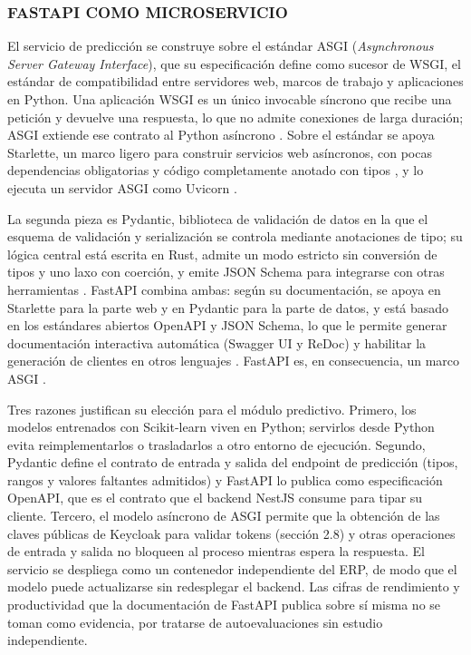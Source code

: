 \subsubsection{FASTAPI COMO MICROSERVICIO}

El servicio de predicción se construye sobre el estándar ASGI (\textit{Asynchronous Server Gateway Interface}), que su especificación define como sucesor de WSGI, el estándar de compatibilidad entre servidores web, marcos de trabajo y aplicaciones en Python. Una aplicación WSGI es un único invocable síncrono que recibe una petición y devuelve una respuesta, lo que no admite conexiones de larga duración; ASGI extiende ese contrato al Python asíncrono \parencite{ASGISpec}. Sobre el estándar se apoya Starlette, un marco ligero para construir servicios web asíncronos, con pocas dependencias obligatorias y código completamente anotado con tipos \parencite{StarletteDocs}, y lo ejecuta un servidor ASGI como Uvicorn \parencite{FastAPIASGI}.

La segunda pieza es Pydantic, biblioteca de validación de datos en la que el esquema de validación y serialización se controla mediante anotaciones de tipo; su lógica central está escrita en Rust, admite un modo estricto sin conversión de tipos y uno laxo con coerción, y emite JSON Schema para integrarse con otras herramientas \parencite{PydanticDocs}. FastAPI combina ambas: según su documentación, se apoya en Starlette para la parte web y en Pydantic para la parte de datos, y está basado en los estándares abiertos OpenAPI y JSON Schema, lo que le permite generar documentación interactiva automática (Swagger UI y ReDoc) y habilitar la generación de clientes en otros lenguajes \parencite{FastAPIDocs}. FastAPI es, en consecuencia, un marco ASGI \parencite{FastAPIASGI}.

Tres razones justifican su elección para el módulo predictivo. Primero, los modelos entrenados con Scikit-learn viven en Python; servirlos desde Python evita reimplementarlos o trasladarlos a otro entorno de ejecución. Segundo, Pydantic define el contrato de entrada y salida del endpoint de predicción (tipos, rangos y valores faltantes admitidos) y FastAPI lo publica como especificación OpenAPI, que es el contrato que el backend NestJS consume para tipar su cliente. Tercero, el modelo asíncrono de ASGI permite que la obtención de las claves públicas de Keycloak para validar tokens (sección 2.8) y otras operaciones de entrada y salida no bloqueen al proceso mientras espera la respuesta. El servicio se despliega como un contenedor independiente del ERP, de modo que el modelo puede actualizarse sin redesplegar el backend. Las cifras de rendimiento y productividad que la documentación de FastAPI publica sobre sí misma no se toman como evidencia, por tratarse de autoevaluaciones sin estudio independiente.

